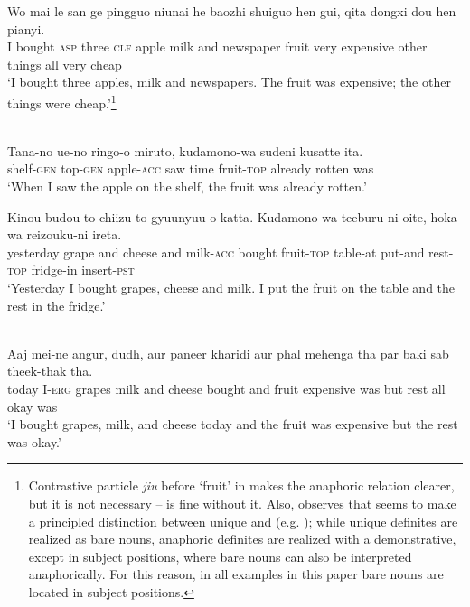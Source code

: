 \documentclass[output=paper,
modfonts
]{langscibook}
\begin{document}
	\ex \label{ex:despic:20b} 
	\gll
	{Wo} {mai} {le} {san} {ge} {pingguo} {niunai} {he} {baozhi} {shuiguo} {hen} {gui,} {qita} {dongxi} {dou} {hen} {pianyi.} \\ 
	I bought \textsc{asp} three \textsc{clf} apple milk and newspaper fruit very expensive other things all very cheap \\
	\glt `I bought three apples, milk and newspapers. The fruit was expensive; the other things were cheap.'\footnote{\label{ft8}Contrastive particle \textit{jiu} before `fruit' in  makes the anaphoric relation clearer, but it is not necessary --  is fine without it. Also, \citet{Jenkstoappear} observes that  seems to make a principled distinction between unique and  (e.g. \citealt{Schwarz2009}); while unique definites are realized as bare nouns, anaphoric definites are realized with a demonstrative, except in subject positions, where bare nouns can also be interpreted anaphorically. For this reason, in all  examples in this paper bare nouns are located in subject positions.} 
	\z 
	\z 
	
	\ea \label{ex:despic:21}
	 \\
	\ea 
	\gll 
	{Tana}-{no} {ue}-{no} {ringo-o} {miruto}, {kudamono}-{wa} {sudeni} {kusatte} {ita}. \\
	shelf-\textsc{gen} {top}-\textsc{gen} apple-\textsc{acc} {saw time} fruit-\textsc{top} already rotten was \\ 
	\glt `When I saw the apple on the shelf, the fruit was already rotten.'
	
	\ex 
	\gll 
	{Kinou} {budou} {to} {chiizu} {to} {gyuunyuu-o} {katta}. {Kudamono-wa} {teeburu-ni} {oite}, {hoka-wa} {reizouku-ni} {ireta}. \\
	yesterday grape and cheese and milk-\textsc{acc} bought fruit-\textsc{top} table-at put-and rest-\textsc{top} fridge-in insert-\textsc{pst} \\
	\glt `Yesterday I bought grapes, cheese and milk. I put the fruit on the table and the rest in the fridge.'
	\z 
	\z 
	
	\ea \label{ex:despic:22}
	 \\
	\gll 
	{Aaj} {mei-ne} {angur}, {dudh}, {aur} {paneer} {kharidi} {aur} {phal} {mehenga} {tha} {par} {baki} {sab} {theek-thak} {tha.} \\
	today I-\textsc{erg} grapes milk and cheese bought and fruit expensive was but rest all okay was \\ 
	\glt `I bought grapes, milk, and cheese today and the fruit was expensive but the rest was okay.'
	\z 
	
\end{document}
